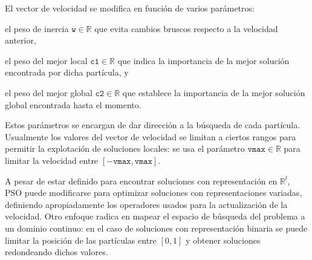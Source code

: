 El vector de velocidad se modifica en función de varios parámetros:
\begin{inparaenum}
\item el peso de inercia $\texttt{w} \in \mathbb{R}$ que evita cambios bruscos respecto a la velocidad anterior,
\item el peso del mejor local $\texttt{c1} \in \mathbb{R}$ que indica la importancia de la mejor solución encontrada por dicha partícula, y
\item  el peso del mejor global $\texttt{c2} \in \mathbb{R}$ que establece la importancia de la mejor solución global encontrada hasta el momento.
\end{inparaenum}
Estos parámetros se encargan de dar dirección a la búsqueda de cada partícula. Usualmente los valores del vector de velocidad se limitan a ciertos rangos para permitir la explotación de soluciones locales: se usa el parámetro $\texttt{vmax} \in \mathbb{R}$ para limitar la velocidad entre $[-\texttt{vmax},\texttt{vmax}]$.

A pesar de estar definido para encontrar soluciones con representación en $\mathbb{R}^l$, PSO puede modificarse para optimizar soluciones con representaciones variadas, definiendo apropiadamente los operadores usados para la actualización de la velocidad. Otro enfoque radica en mapear el espacio de búsqueda del problema a un dominio continuo: en el caso de soluciones con representación binaria se puede limitar la posición de las partículas entre $[0,1]$ y obtener soluciones redondeando dichos valores.
